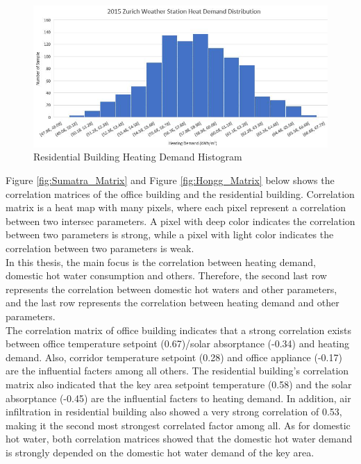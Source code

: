 \documentclass[a4paper, oneside]{discothesis}
\begin{document}
	    \begin{figure}[H]
		\centering
		\includegraphics[scale=0.7]{Hongg_2015Distribution.jpg}
		\caption{Residential Building Heating Demand Histogram}
		\label{fig:Hongg_StationHistogram}
		\end{figure}

		Figure \ref{fig:Sumatra_Matrix} and Figure \ref{fig:Hongg_Matrix} below shows the correlation matrices of the office building and the residential building. Correlation matrix is a heat map with many pixels, where each pixel represent a correlation between two intersec parameters. A pixel with deep color indicates the correlation between two parameters is strong, while a pixel with light color indicates the correlation between two parameters is weak.\\
		
		In this thesis, the main focus is the correlation between heating demand, domestic hot water consumption and others. Therefore, the second last row represents the correlation between domestic hot waters and other parameters, and the last row represents the correlation between heating demand and other parameters.\\
		
		The correlation matrix of office building indicates that a strong correlation exists between office temperature setpoint (0.67)/solar absorptance (-0.34) and heating demand. Also, corridor temperature setpoint (0.28) and office appliance (-0.17) are the influential facters among all others. The residential building's correlation matrix also indicated that the key area setpoint temperature (0.58) and the solar absorptance (-0.45) are the influential facters to heating demand. In addition, air infiltration in residential building also showed a very strong correlation of 0.53, making it the second most strongest correlated factor among all. As for domestic hot water, both correlation matrices showed that the domestic hot water demand is strongly depended on the domestic hot water demand of the key area.
\end{document}
